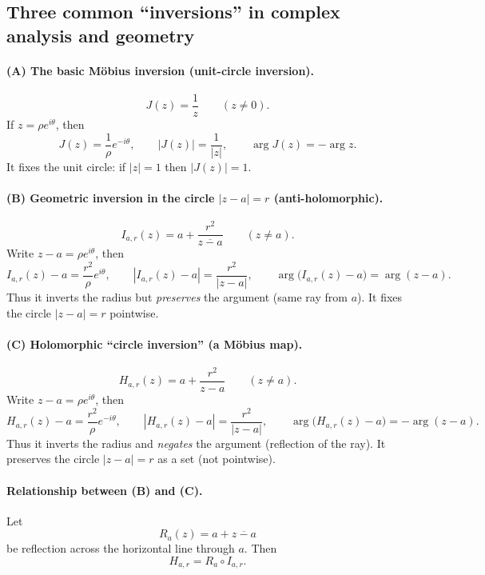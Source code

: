 \documentclass[12pt,a4paper]{article}
\theoremstyle{plain}
\theoremstyle{definition}      %
\begin{document}

\subsection*{\textbf{Three common “inversions” in complex analysis and geometry}}

\paragraph{\textbf{(A) The basic Möbius inversion (unit-circle inversion).}}
\[
J(z)=\frac{1}{z}\qquad (z\neq 0).
\]
If $z=\rho e^{i\theta}$, then
\[
J(z)=\frac{1}{\rho}e^{-i\theta},
\qquad
|J(z)|=\frac{1}{|z|},\qquad \arg J(z)=-\arg z.
\]
It fixes the unit circle: if $|z|=1$ then $|J(z)|=1$.

\paragraph{\textbf{(B) Geometric inversion in the circle $|z-a|=r$ (anti-holomorphic).}}
\[
I_{a,r}(z)=a+\frac{r^{2}}{\overline{z-a}}\qquad (z\neq a).
\]
Write $z-a=\rho e^{i\theta}$, then
\[
I_{a,r}(z)-a=\frac{r^{2}}{\rho}e^{i\theta},
\qquad
|I_{a,r}(z)-a|=\frac{r^{2}}{|z-a|},\qquad
\arg\bigl(I_{a,r}(z)-a\bigr)=\arg(z-a).
\]
Thus it inverts the radius but \emph{preserves} the argument (same ray from $a$). It fixes the circle $|z-a|=r$ pointwise.

\paragraph{\textbf{(C) Holomorphic “circle inversion” (a Möbius map).}}
\[
H_{a,r}(z)=a+\frac{r^{2}}{z-a}\qquad (z\neq a).
\]
Write $z-a=\rho e^{i\theta}$, then
\[
H_{a,r}(z)-a=\frac{r^{2}}{\rho}e^{-i\theta},
\qquad
|H_{a,r}(z)-a|=\frac{r^{2}}{|z-a|},\qquad
\arg\bigl(H_{a,r}(z)-a\bigr)=-\arg(z-a).
\]
Thus it inverts the radius and \emph{negates} the argument (reflection of the ray). It preserves the circle $|z-a|=r$ as a set (not pointwise).

\paragraph{\textbf{Relationship between (B) and (C).}}
Let
\[
R_a(z)=a+\overline{z-a}
\]
be reflection across the horizontal line through $a$. Then
\[
H_{a,r}=R_a\circ I_{a,r}.
\]
\end{document}
